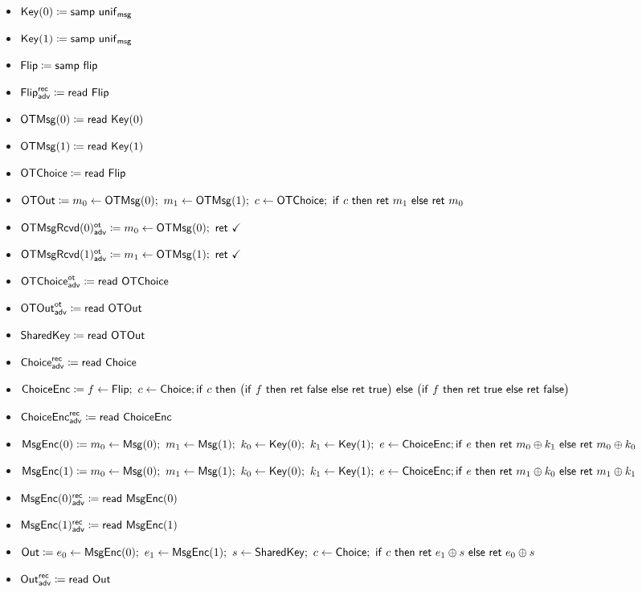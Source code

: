 \begin{itemize}
\item $\Key(0) \coloneqq \samp{\unif_\msg}$
\item $\Key(1) \coloneqq \samp{\unif_\msg}$
\item $\Flip \coloneqq \samp{\flip}$
\item {\color{blue} $\LeakFlip^\rec_\adv \coloneqq \read{\Flip}$}
\item $\OTMsg(0) \coloneqq \read{\Key(0)}$
\item $\OTMsg(1) \coloneqq \read{\Key(1)}$
\item $\OTChoice \coloneqq \read{\Flip}$
\item $\OTOut \coloneqq m_0 \leftarrow \OTMsg(0); \ m_1 \leftarrow \OTMsg(1); \ c \leftarrow \OTChoice; \ \ifte{c}{\ret{m_1}}{\ret{m_0}}$
\item {\color{blue} $\LeakOTMsgRcvd(0)^\ot_\adv \coloneqq m_0 \leftarrow \OTMsg(0); \ \ret{\checkmark}$}
\item {\color{blue} $\LeakOTMsgRcvd(1)^\ot_\adv \coloneqq m_1 \leftarrow \OTMsg(1); \ \ret{\checkmark}$}
\item {\color{blue} $\LeakOTChoice^\ot_\adv \coloneqq \read{\OTChoice}$}
\item {\color{blue} $\LeakOTOut^\ot_\adv \coloneqq \read{\OTOut}$}
\item $\SharedKey \coloneqq \read{\OTOut}$
\item {\color{blue} $\LeakChoice^\rec_\adv \coloneqq \read{\Choice}$}
\item $\ChoiceEnc \coloneqq f \leftarrow \Flip; \ c \leftarrow \Choice; \\ \ifte{c}{\big(\ifte{f}{\ret{\false}}{\ret{\true}}\big)}{\big(\ifte{f}{\ret{\true}}{\ret{\false}}\big)}$
\item {\color{blue} $\LeakChoiceEnc^\rec_\adv \coloneqq \read{\ChoiceEnc}$}
\item $\MsgEnc(0) \coloneqq m_0 \leftarrow \Msg(0); \ m_1 \leftarrow \Msg(1); \ k_0 \leftarrow \Key(0); \ k_1 \leftarrow \Key(1); \ e \leftarrow \ChoiceEnc; \\ \ifte{e}{\ret{m_0 \oplus k_1}}{\ret{m_0 \oplus k_0}}$
\item $\MsgEnc(1) \coloneqq m_0 \leftarrow \Msg(0); \ m_1 \leftarrow \Msg(1); \ k_0 \leftarrow \Key(0); \ k_1 \leftarrow \Key(1); \ e \leftarrow \ChoiceEnc; \\ \ifte{e}{\ret{m_1 \oplus k_0}}{\ret{m_1 \oplus k_1}}$
\item {\color{blue} $\LeakMsgEnc(0)^\rec_\adv \coloneqq \read{\MsgEnc(0)}$}
\item {\color{blue} $\LeakMsgEnc(1)^\rec_\adv \coloneqq \read{\MsgEnc(1)}$}
\item $\Out \coloneqq e_0 \leftarrow \MsgEnc(0); \ e_1 \leftarrow \MsgEnc(1); \ s \leftarrow \SharedKey; \ c \leftarrow \Choice; \  \ifte{c}{\ret{e_1 \oplus s}}{\ret{e_0 \oplus s}}$
\item {\color{blue} $\LeakOut^\rec_\adv \coloneqq \read{\Out}$}
\end{itemize}

